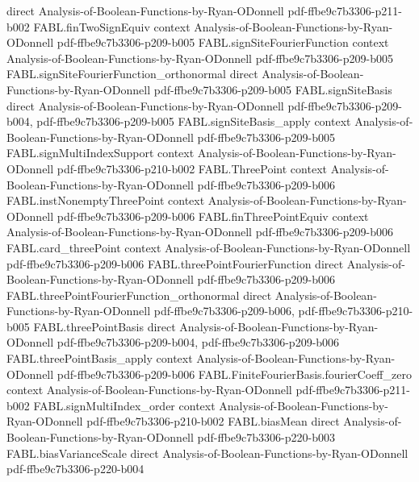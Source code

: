 \begin{theorem}
  {direct}
  {Analysis-of-Boolean-Functions-by-Ryan-ODonnell}
  {pdf-ffbe9c7b3306-p211-b002}
\proofstep
  {FABL.finTwoSignEquiv}
  {context}
  {Analysis-of-Boolean-Functions-by-Ryan-ODonnell}
  {pdf-ffbe9c7b3306-p209-b005}
\proofstep
  {FABL.signSiteFourierFunction}
  {context}
  {Analysis-of-Boolean-Functions-by-Ryan-ODonnell}
  {pdf-ffbe9c7b3306-p209-b005}
\proofstep
  {FABL.signSiteFourierFunction_orthonormal}
  {direct}
  {Analysis-of-Boolean-Functions-by-Ryan-ODonnell}
  {pdf-ffbe9c7b3306-p209-b005}
\proofstep
  {FABL.signSiteBasis}
  {direct}
  {Analysis-of-Boolean-Functions-by-Ryan-ODonnell}
  {pdf-ffbe9c7b3306-p209-b004,
    pdf-ffbe9c7b3306-p209-b005}
\proofstep
  {FABL.signSiteBasis_apply}
  {context}
  {Analysis-of-Boolean-Functions-by-Ryan-ODonnell}
  {pdf-ffbe9c7b3306-p209-b005}
\proofstep
  {FABL.signMultiIndexSupport}
  {context}
  {Analysis-of-Boolean-Functions-by-Ryan-ODonnell}
  {pdf-ffbe9c7b3306-p210-b002}
\proofstep
  {FABL.ThreePoint}
  {context}
  {Analysis-of-Boolean-Functions-by-Ryan-ODonnell}
  {pdf-ffbe9c7b3306-p209-b006}
\proofstep
  {FABL.instNonemptyThreePoint}
  {context}
  {Analysis-of-Boolean-Functions-by-Ryan-ODonnell}
  {pdf-ffbe9c7b3306-p209-b006}
\proofstep
  {FABL.finThreePointEquiv}
  {context}
  {Analysis-of-Boolean-Functions-by-Ryan-ODonnell}
  {pdf-ffbe9c7b3306-p209-b006}
\proofstep
  {FABL.card_threePoint}
  {context}
  {Analysis-of-Boolean-Functions-by-Ryan-ODonnell}
  {pdf-ffbe9c7b3306-p209-b006}
\proofstep
  {FABL.threePointFourierFunction}
  {direct}
  {Analysis-of-Boolean-Functions-by-Ryan-ODonnell}
  {pdf-ffbe9c7b3306-p209-b006}
\proofstep
  {FABL.threePointFourierFunction_orthonormal}
  {direct}
  {Analysis-of-Boolean-Functions-by-Ryan-ODonnell}
  {pdf-ffbe9c7b3306-p209-b006,
    pdf-ffbe9c7b3306-p210-b005}
\proofstep
  {FABL.threePointBasis}
  {direct}
  {Analysis-of-Boolean-Functions-by-Ryan-ODonnell}
  {pdf-ffbe9c7b3306-p209-b004,
    pdf-ffbe9c7b3306-p209-b006}
\proofstep
  {FABL.threePointBasis_apply}
  {context}
  {Analysis-of-Boolean-Functions-by-Ryan-ODonnell}
  {pdf-ffbe9c7b3306-p209-b006}
\proofstep
  {FABL.FiniteFourierBasis.fourierCoeff_zero}
  {context}
  {Analysis-of-Boolean-Functions-by-Ryan-ODonnell}
  {pdf-ffbe9c7b3306-p211-b002}
\proofstep
  {FABL.signMultiIndex_order}
  {context}
  {Analysis-of-Boolean-Functions-by-Ryan-ODonnell}
  {pdf-ffbe9c7b3306-p210-b002}
\proofstep
  {FABL.biasMean}
  {direct}
  {Analysis-of-Boolean-Functions-by-Ryan-ODonnell}
  {pdf-ffbe9c7b3306-p220-b003}
\proofstep
  {FABL.biasVarianceScale}
  {direct}
  {Analysis-of-Boolean-Functions-by-Ryan-ODonnell}
  {pdf-ffbe9c7b3306-p220-b004}

\end{theorem}
